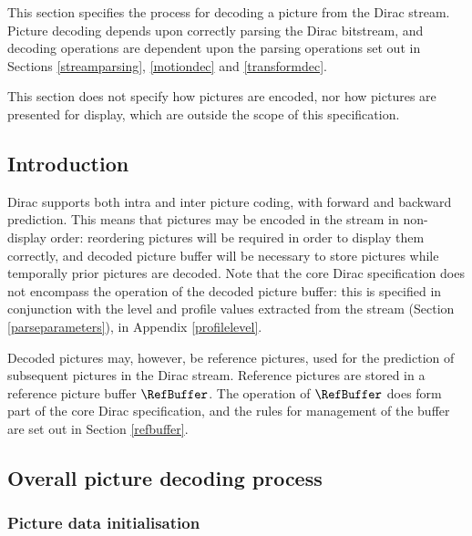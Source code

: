 
\label{picturedec}

This section specifies the process for decoding a picture from the Dirac stream. Picture decoding depends upon
correctly parsing the Dirac bitstream, and decoding operations are dependent upon the parsing operations
set out in Sections \ref{streamparsing}, \ref{motiondec} and \ref{transformdec}.

This section does not specify how pictures are encoded, nor how pictures are presented for display, 
which are outside the scope of this specification.

\subsection{Introduction}

Dirac supports both intra and inter picture coding, with forward and backward prediction. This means that
pictures may be encoded in the stream in non-display order: reordering pictures will be required in order
to display them correctly, and  decoded picture buffer will be necessary to store pictures while temporally 
prior pictures are decoded. Note that the core Dirac specification does not encompass the operation of the
decoded picture buffer: this is specified in conjunction with the level and profile values extracted from
the stream (Section \ref{parseparameters}), in Appendix \ref{profilelevel}. 

Decoded pictures may, however, be reference pictures, used for the prediction of subsequent pictures
in the Dirac stream. Reference pictures are stored in a reference picture buffer $\RefBuffer$. The operation
of $\RefBuffer$ does form part of the core Dirac specification, and the rules for management of the
buffer are set out in Section \ref{refbuffer}.

\subsection{Overall picture decoding process}
\label{overallpicturedec}

\subsubsection{Picture data initialisation}
\label{picdataconventions}

